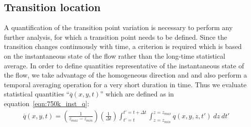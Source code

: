 \subsection{Transition location}
A quantification of the transition point variation is necessary to perform any further analysis, for which a transition point needs to be defined. Since the transition changes continuously with time, a criterion is required which is based on the instantaneous state of the flow rather than the long-time statistical average. In order to define quantities representative of the instantaneous state of the flow, we take advantage of the homogeneous direction and and also perform a temporal averaging operation for a very short duration in time. Thus we evaluate statistical quantities ``$\overline{q}(x,y,t)$'' which are defined as in equation~\ref{eqn:750k_inst_q}:
\begin{align}
	\overline{q}(x,y,t) = \left(\frac{1}{z_{max}-z_{min}}\right)\left(\frac{1}{\Delta t}\right)\int_{t'=t}^{t'=t+\Delta t}\int_{z=z_{min}}^{z=z_{max}}q(x,y,z,t')\ dz\ dt'
	\label{eqn:750k_inst_q}
\end{align}
